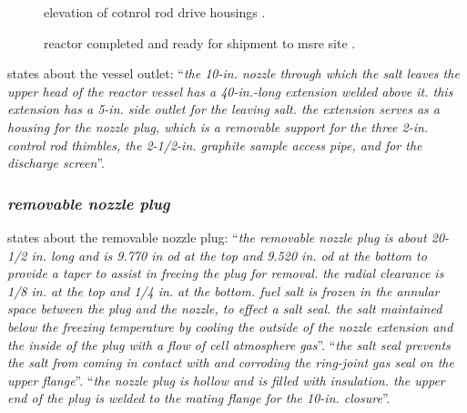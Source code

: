\documentclass[ms,a4paper]{memoir}
\newcommand*{\mrsarchive}{../../msr-archive}%
\begin{document}
\begin{figure}[H]
  \centering
  \caption{elevation of cotnrol rod drive housings \parencite[page 111-112]{ornl-tm-0728}.}
  \label{0728-p111-p112}
\end{figure}

\begin{figure}[H]
  \centering
  \caption{reactor completed and ready for shipment to msre site \parencite[figure 44]{ornl-3708}.}
\end{figure}



\parencite[page 104]{ornl-tm-0728} states about the vessel outlet:
\enquote{\textit{the 10-in. nozzle through which the salt leaves the upper head of the reactor vessel has a 40-in.-long extension welded above it. this extension has a 5-in. side outlet for the leaving salt. the extension serves as a housing for the nozzle plug, which is a removable support for the three 2-in. control rod thimbles, the 2-1/2-in. graphite sample access pipe, and for the discharge screen}}.

\subsubsection{\emph{removable nozzle plug}}
\parencite[page 104-105]{ornl-tm-0728} states about the removable nozzle plug:
\enquote{\textit{the removable nozzle plug is about 20-1/2 in. long and is 9.770 in od at the top and 9.520 in. od at the bottom to provide a taper to assist in freeing the plug for removal. the radial clearance is 1/8 in. at the top and 1/4 in. at the bottom. fuel salt is frozen in the annular space between the plug and the nozzle, to effect a salt seal. the salt maintained below the freezing temperature by cooling the outside of the nozzle extension and the inside of the plug with a flow of cell atmosphere gas}}.
\enquote{\textit{the salt seal prevents the salt from coming in contact with and corroding the ring-joint gas seal on the upper flange}}.
\enquote{\textit{the nozzle plug is hollow and is filled with insulation. the upper end of the plug is welded to the mating flange for the 10-in. closure}}.
\end{document}
